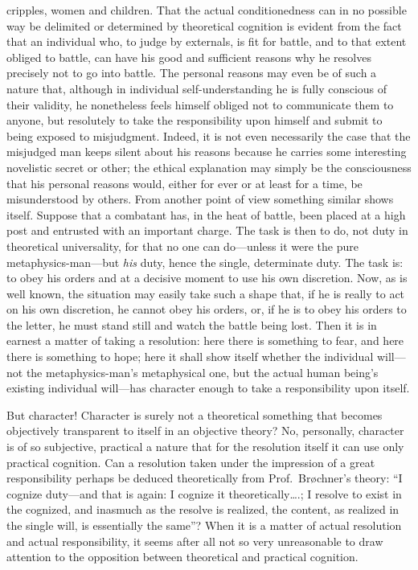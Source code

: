 \documentclass[12pt]{book}
\newcommand{\opage}[1]{\marginnote{\footnotesize\textit{[#1]}}}
\begin{document}
cripples, women and children. That the
\opage{35}\setcounter{footnote}{0}%
actual conditionedness can in no possible way be delimited or determined
by theoretical cognition is evident from the fact that an individual who,
to judge by externals, is fit for battle, and to that extent obliged to
battle, can have his good and sufficient reasons why he resolves precisely
not to go into battle. The personal reasons may even be of such a nature
that, although in individual self-understanding he is fully conscious of
their validity, he nonetheless feels himself obliged not to communicate
them to anyone, but resolutely to take the responsibility upon himself and
submit to being exposed to misjudgment. Indeed, it is not even necessarily
the case that the misjudged man keeps silent about his reasons because he
carries some interesting novelistic secret or other; the ethical
explanation may simply be the consciousness that his personal reasons
would, either for ever or at least for a time, be misunderstood by others.
From another point of view something similar shows itself. Suppose that a
combatant has, in the heat of battle, been placed at a high post and
entrusted with an important charge. The task is then to do, not duty in
theoretical universality, for that no one can do---unless it were the pure
metaphysics-man---but \emph{his} duty, hence the single, determinate duty.
The task is: to obey his orders and at a decisive moment to use his own
discretion. Now, as is well known, the situation may easily take such a
shape that, if he is really to act on his own discretion, he cannot obey
his orders, or, if he is to obey his orders to the letter, he must stand
still and watch the battle being lost. Then it is in earnest a matter of
taking a resolution: here there is something to fear, and here there is
something to hope; here it shall show itself whether the individual
will---not the metaphysics-man's metaphysical one, but the actual human
being's existing individual will---has character enough to take a
responsibility upon itself.

\opage{36}\setcounter{footnote}{0}%
But character! Character is surely not a theoretical something that
becomes objectively transparent to itself in an objective theory? No,
personally, character is of so subjective, practical a nature that for the
resolution itself it can use only practical cognition. Can a resolution
taken under the impression of a great responsibility perhaps be deduced
theoretically from Prof.~Brøchner's theory: ``I cognize duty---and that is
again: I cognize it theoretically\ldots.; I resolve to exist in the
cognized, and inasmuch as the resolve is realized, the content, as realized
in the single will, is essentially the same''? When it is a matter of
actual resolution and actual responsibility, it seems after all not so
very unreasonable to draw attention to the opposition between theoretical
and practical cognition.
\end{document}
